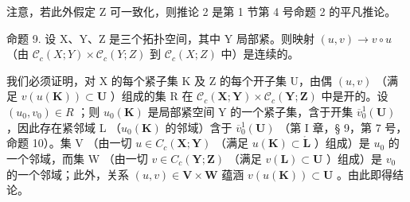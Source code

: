 注意，若此外假定 Z 可一致化，则推论 2 是第 1 节第 4 号命题 2 的平凡推论。

命题 9. 设 X、Y、Z 是三个拓扑空间，其中 Y 局部紧。则映射 \((u, v) \to v \circ u\) （由 \(\mathcal{C}_c(X; Y) \times \mathcal{C}_c(Y; Z)\) 到 \(\mathcal{C}_c(X; Z)\) 中）是连续的。

我们必须证明，对 X 的每个紧子集 K 及 Z 的每个开子集 U，由偶 \((u, v)\) （满足 \(v(u(\mathbf{K})) \subset \mathbf{U}\) ）组成的集 R 在 \(\mathcal{C}_{c}(\mathbf{X}; \mathbf{Y}) \times \mathcal{C}_{c}(\mathbf{Y}; \mathbf{Z})\) 中是开的。设 \((u_{0}, v_{0}) \in R\) ；则 \(u_{0}(\mathbf{K})\) 是局部紧空间 Y 的一个紧子集，含于开集 \(\overline{v}_{0}^{1}(\mathbf{U})\) ，因此存在紧邻域 L （\(u_{0}(\mathbf{K})\) 的邻域）含于 \(\overline{v}_{0}^{1}(\mathbf{U})\) （第 I 章，§ 9，第 7 号，命题 10）。集 V （由一切 \(u \in C_{c}(\mathbf{X}; \mathbf{Y})\) （满足 \(u(\mathbf{K}) \subset \mathring{\mathbf{L}}\) ）组成）是 \(u_{0}\) 的一个邻域，而集 W （由一切 \(v \in C_{c}(\mathbf{Y}; \mathbf{Z})\) （满足 \(v(\mathbf{L}) \subset \mathbf{U}\) ）组成）是 \(v_{0}\) 的一个邻域；此外，关系 \((u, v) \in \mathbf{V} \times \mathbf{W}\) 蕴涵 \(v(u(\mathbf{K})) \subset \mathbf{U}\) 。由此即得结论。

